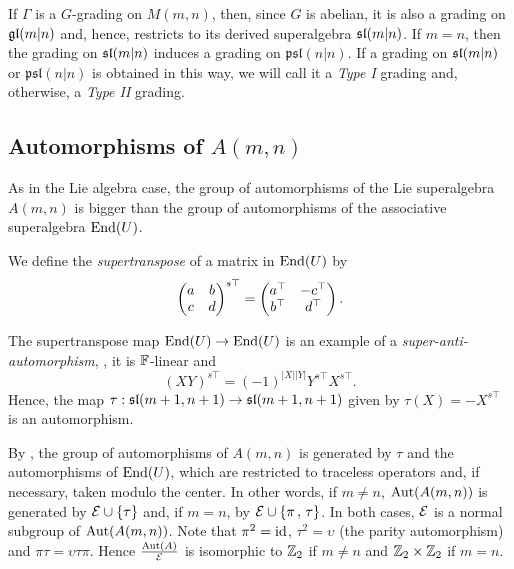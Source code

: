 \begin{defi}\label{def:Type-I}
	If $\Gamma$ is a $G$-grading on $M(m,n)$, then, since $G$ is abelian,  it is also a grading on $\mathfrak{gl}(m|n)$ and, hence, restricts to its derived superalgebra $\mathfrak{sl}(m|n)$. If $m=n$, then the grading on $\mathfrak{sl}(m|n)$ induces a grading on $\mathfrak{psl}(n|n)$.
	If a grading on $\mathfrak{sl}(m|n)$ or $\mathfrak{psl}(n|n)$ is obtained in this way, we will call it a \emph{Type I} grading and, otherwise, a \emph{Type II} grading.
\end{defi}


\subsection{Automorphisms of $A(m,n)$}\label{ssec:auto-Amn}
As in the Lie algebra case, the group of automorphisms of the Lie superalgebra $A(m,n)$ is bigger than the group of automorphisms of the associative superalgebra $\operatorname{End}(U)$.

We define the \emph{supertranspose} of a matrix in $\operatorname{End}(U)$ by
%
\begin{equation*} %
	\left( \begin{matrix}
		a&b\\
		c&d\\
		\end{matrix}\right)^{s\top} = \left( \begin{matrix}
		a\transp & -c\transp\\
		b\transp & d\transp\\
		\end{matrix}\right).
\end{equation*}
%

The supertranspose map $\operatorname{End}(U) \to \operatorname{End}(U)$ is an example of a \emph{super-anti-automorphism}, \ie, it is $\mathbb{F}$-linear and
\[
	(XY)^{s\top} = (-1)^{|X||Y|} Y^{s\top} X^{s\top}.
\]
Hence, the map $\tau:\mathfrak{sl}(m+1,n+1)\rightarrow \mathfrak{sl}(m+1,n+1)$ given by $\tau(X) = - X^{s\top}$ is an automorphism.

By \cite[Theorem 1]{serganova}, the group of automorphisms of $A(m,n)$ is generated by $\tau$ and the automorphisms of $\operatorname{End}(U)$, which are restricted to traceless operators and, if necessary, taken modulo the center. In other words, if $m\neq n$, $\operatorname{Aut}(A(m,n))$ is generated by $\mathcal E \cup \{\tau\}$ and, if $m=n$, by $\mathcal E \cup \{\pi\,,\,\tau\}$. In both cases, $\mathcal E$ is a normal subgroup of $\operatorname{Aut}(A(m,n))$. Note that $\pi^2 = \operatorname{id}$, $\tau^2=\upsilon$ (the parity automorphism) and $\pi \tau = \upsilon \tau \pi$. Hence $\frac{\operatorname{Aut}(A)}{\mathcal E}$ is isomorphic to $\mathbb{Z}_{2}$ if $m\neq n$ and $\mathbb{Z}_2\times\mathbb{Z}_2$ if $m=n$.

